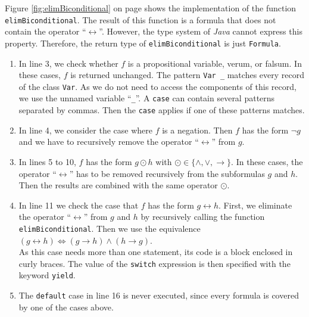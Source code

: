Figure \ref{fig:elimBiconditional} on page \pageref{fig:elimBiconditional} shows the implementation of the
function \texttt{elimBiconditional}.  The result of this function is a formula that does not contain the
operator ``$\leftrightarrow$''.  However, the type system of \textsl{Java} cannot express this property.  Therefore,
the return type of \texttt{elimBiconditional} is just \texttt{Formula}.
\begin{enumerate}
\item In line 3, we check whether $f$ is a propositional variable, verum, or falsum.  In these cases,
      $f$ is returned unchanged.  The pattern \texttt{Var \_} matches every record of the class \texttt{Var}.
      As we do not need to access the components of this record, we use the unnamed variable ``\texttt{\_}''.
      A \texttt{case} can contain several patterns separated by commas.  Then the \texttt{case} applies if
      one of these patterns matches.
\item In line 4, we consider the case where $f$ is a negation.  Then $f$ has the form $\neg g$
      and we have to recursively remove the operator ``$\leftrightarrow$'' from $g$.
\item In lines 5 to 10, $f$ has the form $g \odot h$ with $\odot \in \{\wedge, \vee, \rightarrow\}$.
      In these cases, the operator ``$\leftrightarrow$'' has to be removed recursively from the subformulas $g$
      and $h$.  Then the results are combined with the same operator $\odot$.
\item In line 11 we check the case that $f$ has the form $g \leftrightarrow h$.
      First, we eliminate the operator ``$\leftrightarrow$'' from $g$ and $h$ by recursively
      calling the function \texttt{elimBiconditional}.  Then we use the equivalence
      \\[0.2cm]
      \hspace*{1.3cm}
      $(g \leftrightarrow h) \Leftrightarrow (g \rightarrow h) \wedge (h \rightarrow g)$.
      \\[0.2cm]
      As this case needs more than one statement, its code is a block enclosed in curly braces.  The value of
      the \texttt{switch} expression is then specified with the keyword \texttt{yield}.
\item The \texttt{default} case in line 16 is never executed, since every formula is covered by one of the
      cases above.
\end{enumerate}
\FloatBarrier

